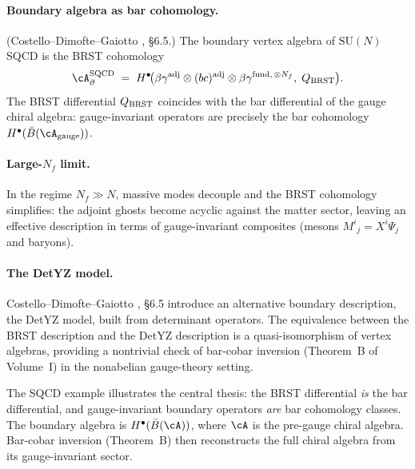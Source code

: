 \paragraph{Boundary algebra as bar cohomology.}
\begin{proposition}
\textup{(Costello--Dimofte--Gaiotto \cite{CDG2023}, \S6.5.)}
The boundary vertex algebra of $\mathrm{SU}(N)$ SQCD is the BRST
cohomology
\[
 \cA_\partial^{\mathrm{SQCD}}
 \;=\;
 H^\bullet\!\bigl(
 \beta\gamma^{\mathrm{adj}} \otimes (bc)^{\mathrm{adj}}
 \otimes \beta\gamma^{\mathrm{fund},\, \otimes N_f},\;
 \QBRST
 \bigr).
\]
The BRST differential $Q_{\mathrm{BRST}}$ coincides with the bar differential of
the gauge chiral algebra: gauge-invariant operators are precisely the
bar cohomology $H^\bullet(\bar{B}(\cA_{\mathrm{gauge}}))$.
\end{proposition}

\paragraph{Large-$N_f$ limit.}
In the regime $N_f \gg N$, massive modes decouple and the BRST
cohomology simplifies: the adjoint ghosts become acyclic against the
matter sector, leaving an effective description in terms of
gauge-invariant composites (mesons $M^i{}_j = X^i \Psi_j$ and baryons).

\paragraph{The DetYZ model.}
Costello--Dimofte--Gaiotto \cite{CDG2023}, \S6.5 introduce an
alternative boundary description, the DetYZ model, built from
determinant operators. The equivalence between the BRST description
and the DetYZ description is a quasi-isomorphism of vertex algebras,
providing a nontrivial check of bar-cobar inversion (Theorem~B of
Volume~I) in the nonabelian gauge-theory setting.

\begin{remark}
The SQCD example illustrates the central thesis: the BRST differential
\emph{is} the bar differential, and gauge-invariant boundary operators
\emph{are} bar cohomology classes. The boundary algebra is
$H^\bullet(\bar{B}(\cA))$, where $\cA$ is the pre-gauge chiral algebra.
Bar-cobar inversion (Theorem~B) then reconstructs the full chiral
algebra from its gauge-invariant sector.
\end{remark}

